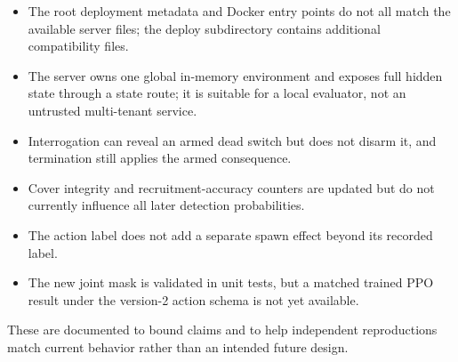 \begin{itemize}[leftmargin=*]
  \item The root deployment metadata and Docker entry points do not all match the available server files; the deploy subdirectory contains additional compatibility files.
  \item The server owns one global in-memory environment and exposes full hidden state through a state route; it is suitable for a local evaluator, not an untrusted multi-tenant service.
  \item Interrogation can reveal an armed dead switch but does not disarm it, and termination still applies the armed consequence.
  \item Cover integrity and recruitment-accuracy counters are updated but do not currently influence all later detection probabilities.
  \item The  action label does not add a separate spawn effect beyond its recorded label.
  \item The new joint mask is validated in unit tests, but a matched trained PPO result under the version-2 action schema is not yet available.
\end{itemize}

These are documented to bound claims and to help independent reproductions match current behavior rather than an intended future design.
